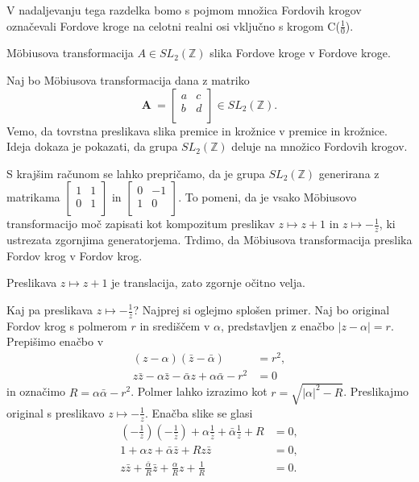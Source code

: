 \documentclass[mat1]{fmfdelo}
\begin{document}
V nadaljevanju tega razdelka bomo s pojmom množica Fordovih krogov označevali Fordove kroge na celotni realni osi vključno s krogom C($\frac{1}{0}$).

\begin{izrek}
\label{izr:MobDelovanje}
M\"{o}biusova transformacija $A \in {SL}_{2}(\mathbb{Z})$ slika Fordove kroge v Fordove kroge.
\end{izrek}

\begin{dokaz}
Naj bo M\"{o}biusova transformacija dana z matriko 
\[
\mathbf{A}\ =
\left[
\begin{array}{cc}
a & c \\
b & d \\
\end{array}
\right]
\in {SL}_{2}(\mathbb{Z}).
\]
Vemo, da tovrstna preslikava slika premice in krožnice v premice in krožnice. Ideja dokaza je pokazati, da grupa ${SL}_{2}(\mathbb{Z})$ deluje na množico Fordovih krogov.

S krajšim računom se lahko prepričamo, da je grupa ${SL}_{2}(\mathbb{Z})$ generirana z matrikama 
\(
\left[
\begin{array}{cc}
1 & 1 \\
0 & 1 \\
\end{array}
\right]
\)
in
\(
\left[
\begin{array}{cc}
0 & -1 \\
1 & 0 \\
\end{array}
\right]
\).
To pomeni, da je vsako M\"{o}biusovo transformacijo moč zapisati kot kompozitum preslikav $z \mapsto z+1$ in $z \mapsto -\frac{1}{z}$, ki ustrezata zgornjima generatorjema. Trdimo, da M\"{o}biusova transformacija preslika Fordov krog v Fordov krog. 

Preslikava $z \mapsto z+1$ je translacija, zato zgornje očitno velja.

Kaj pa preslikava $z \mapsto -\frac{1}{z}$? Najprej si oglejmo splošen primer. Naj bo original Fordov krog s polmerom $r$ in središčem v $\alpha$, predstavljen z enačbo $ |z-\alpha|=r$. Prepišimo enačbo v
\begin{align}
(z-\alpha)( \bar{z}-\bar{\alpha}) &= r^2, \nonumber \\
z\bar{z} - \alpha \bar{z} - \bar{\alpha} z + \alpha \bar{\alpha} - r^2 &= 0
\end{align}
in označimo $R = \alpha \bar{\alpha} - r^2$. Polmer lahko izrazimo kot $r = \sqrt{|\alpha|^2-R}$.
%
Preslikajmo original s preslikavo $z \mapsto -\frac{1}{z}$. Enačba slike se glasi
\begin{align}
\label{Eq:MobSlika}
\left(-\frac{1}{z}\right)\left(-\frac{1}{\bar{z}}\right) + \alpha \frac{1}{\bar{z}} + \bar{\alpha} \frac{1}{z} + R &= 0, \nonumber \\
1 + \alpha z + \bar{\alpha} \bar{z} + Rz \bar{z} &= 0, \nonumber \\
z \bar{z} + \frac{\bar{\alpha}}{R} \bar{z} + \frac{\alpha}{R} z + \frac{1}{R} &= 0.
\end{align}
%


\end{dokaz}
\end{document}
